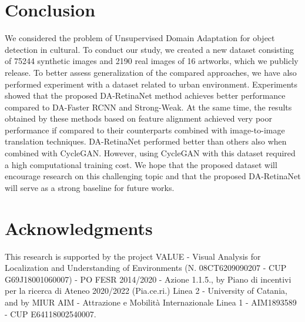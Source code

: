 \documentclass[preprint]{elsarticle}
\begin{document}
\section{Conclusion}
We considered the problem of Unsupervised Domain Adaptation for object detection in cultural. To conduct our study, we created a new dataset consisting of 75244 synthetic images and 2190 real images of 16 artworks, which we publicly release. To better assess generalization of the compared approaches, we have also performed experiment with a dataset related to urban environment.
Experiments showed that the proposed DA-RetinaNet method achieves better performance compared to DA-Faster RCNN and Strong-Weak. 
At the same time, the results obtained by these methods based on feature alignment achieved very poor performance if compared to their counterparts combined with image-to-image translation techniques. 
DA-RetinaNet performed better than others also when combined with CycleGAN. However, using CycleGAN with this dataset required a high computational training cost.
We hope that the proposed dataset will encourage research on this challenging topic and that the proposed DA-RetinaNet will serve as a strong baseline for future works.
\label{conclusion}
\section*{Acknowledgments}
This research is supported by the project VALUE - Visual Analysis for Localization and Understanding of Environments (N. 08CT6209090207 - CUP G69J18001060007) - PO FESR 2014/2020 - Azione 1.1.5., by Piano di incentivi per la ricerca di Ateneo 2020/2022 (Pia.ce.ri.) Linea 2 - University of Catania, and by MIUR AIM - Attrazione e Mobilit\`a Internazionale Linea 1 - AIM1893589 - CUP E64118002540007.

\end{document}

